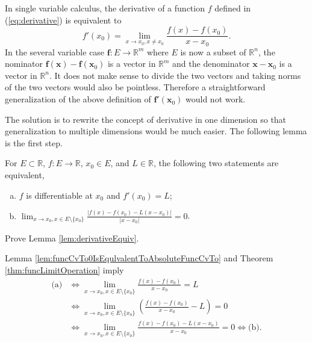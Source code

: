 \begin{rem}
  \label{rem:singleVarDiff2MultiVarDiff}
  In single variable calculus,
  the derivative of a function $f$ defined in (\ref{eq:derivative})
  is equivalent to 
  \begin{displaymath}
    f'(x_0)=\lim_{x\rightarrow x_0, x\ne x_0} \frac{f(x)-f(x_0)}{x-x_0}.
  \end{displaymath}
  In the several variable case $\mathbf{f}: E\rightarrow \mathbb{R}^m$
  where $E$ is now a subset of $\mathbb{R}^n$,
  the nominator $\mathbf{f}(\mathbf{x})-\mathbf{f}(\mathbf{x}_0)$
  is a vector in $\mathbb{R}^m$
  and the denominator $\mathbf{x}-\mathbf{x}_0$
  is a vector in $\mathbb{R}^n$.
  It does not make sense to divide the two vectors and
   taking norms of the two vectors would also be pointless.
  Therefore a straightforward generalization
  of the above definition of $\mathbf{f}'(\mathbf{x}_0)$
  would not work.

  The solution is to rewrite the concept of derivative
  in one dimension so that generalization to multiple dimensions
  would be much easier.
  The following lemma is the first step.
\end{rem}

\begin{lem}
  \label{lem:derivativeEquiv}
  For $E\subset \mathbb{R}$, $f: E\rightarrow \mathbb{R}$,
  $x_0\in E$, and $L\in \mathbb{R}$,
  the following two statements are equivalent,
  \begin{enumerate}[(a)]\itemsep0em
  \item $f$ is differentiable at $x_0$ and $f'(x_0)=L$;
  \item $\lim_{x\rightarrow x_0, x\in E\setminus\{x_0\}} \frac{|f(x)-
      f(x_0) - L(x-x_0)|}{|x-x_0|}=0$.
  \end{enumerate}
\end{lem}

\begin{exc}
  Prove Lemma \ref{lem:derivativeEquiv}.
\end{exc}

\begin{solution}
  Lemma \ref{lem:funcCvTo0IsEqulvalentToAbsoluteFuncCvTo}
  and Theorem \ref{thm:funcLimitOperation} imply
  \begin{align*}
    \text{(a)}
    &\Leftrightarrow \lim_{x\rightarrow x_{0},x\in E\setminus\{x_{0}\}}
      \frac{f(x)-f(x_{0})}{x-x_{0}}=L\\
    &\Leftrightarrow \lim_{x\rightarrow x_{0},x\in E\setminus\{x_{0}\}}
      \left(\frac{f(x)-f(x_{0})}{x-x_{0}}-L\right)=0\\
    &\Leftrightarrow \lim_{x\rightarrow x_{0},x\in E\setminus\{x_{0}\}}
      \frac{f(x)-f(x_{0})-L(x-x_{0})}{x-x_{0}}=0
     \Leftrightarrow \text{(b)}.
  \end{align*}
\end{solution}

